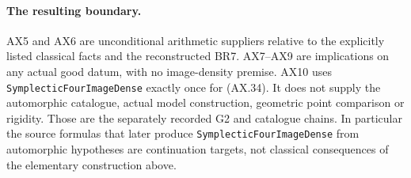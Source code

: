 \paragraph{The resulting boundary.}
AX5 and AX6 are unconditional arithmetic suppliers relative to
the explicitly listed classical facts and the reconstructed BR7.
AX7--AX9 are implications on any actual good datum, with no
image-density premise.  AX10 uses
\texttt{SymplecticFourImageDense} exactly once for (AX.34).
It does not supply the automorphic catalogue, actual model
construction, geometric point comparison or rigidity.  Those
are the separately recorded G2 and catalogue chains.  In
particular the source formulas that later produce
\texttt{SymplecticFourImageDense} from automorphic hypotheses
are continuation targets, not classical consequences of
the elementary construction above.
